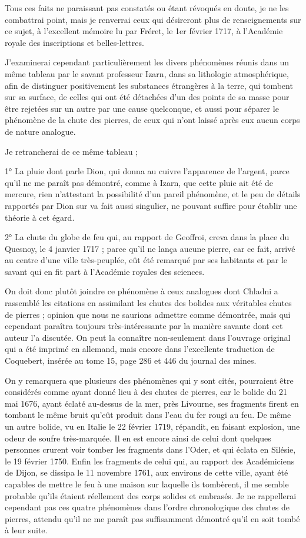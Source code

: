 \documentclass[a4paper, 12pt, oneside, french]{article}
\begin{document}
Tous ces faits ne paraissant pas constatés ou étant révoqués en doute, je ne les combattrai point, mais je renverrai ceux qui désireront plus de renseignements sur ce sujet, à l'excellent mémoire lu par Fréret, le 1er février 1717, à l'Académie royale des inscriptions et belles-lettres.

J'examinerai cependant particulièrement les divers phénomènes réunis dans un même tableau par le savant professeur Izarn, dans sa lithologie atmosphérique, afin de distinguer positivement les substances étrangères à la terre, qui tombent sur sa surface, de celles qui ont été détachées d'un des points de sa masse pour être rejetées sur un autre par une cause quelconque, et aussi pour séparer le phénomène de la chute des pierres, de ceux qui n'ont laissé après eux aucun corps de nature analogue.

Je retrancherai de ce même tableau ;

1° La pluie dont parle Dion, qui donna au cuivre l'apparence de l'argent, parce qu'il ne me paraît pas démontré, comme à Izarn, que cette pluie ait été de mercure, rien n'attestant la possibilité d'un pareil phénomène, et le peu de détails rapportés par Dion sur va fait aussi singulier, ne pouvant suffire pour établir une théorie à cet égard.

2° La chute du globe de feu qui, au rapport de Geoffroi, creva dans la place du Quesnoy, le 4 janvier 1717 ; parce qu'il ne lança aucune pierre, car ce fait, arrivé au centre d'une ville très-peuplée, eût été remarqué par ses habitants et par le savant qui en fit part à l'Académie royales des sciences.

On doit donc plutôt joindre ce phénomène à ceux analogues dont Chladni a rassemblé les citations en assimilant les chutes des bolides aux véritables chutes de pierres ; opinion que nous ne saurions admettre comme démontrée, mais qui cependant paraîtra toujours très-intéressante par la manière savante dont cet auteur l'a discutée. On peut la connaître non-seulement dans l'ouvrage original qui a été imprimé en allemand, mais encore dans l'excellente traduction de Coquebert, insérée au tome 15, page 286 et 446 du journal des mines.

On y remarquera que plusieurs des phénomènes qui y sont cités, pourraient être considérés comme ayant donné lieu à des chutes de pierres, car le bolide du 21 mai 1676, ayant éclaté au-dessus de la mer, près Livourne, ses fragments firent en tombant le même bruit qu'eût produit dans l'eau du fer rougi au feu. De même un autre bolide, vu en Italie le 22 février 1719, répandit, en faisant explosion, une odeur de soufre très-marquée. Il en est encore ainsi de celui dont quelques personnes crurent voir tomber les fragments dans l'Oder, et qui éclata en Silésie, le 19 février 1750. Enfin les fragments de celui qui, au rapport des Académiciens de Dijon, se dissipa le 11 novembre 1761, aux environs de cette ville, ayant été capables de mettre le feu à une maison sur laquelle ils tombèrent, il me semble probable qu'ils étaient réellement des corps solides et embrasés. Je ne rappellerai cependant pas ces quatre phénomènes dans l'ordre chronologique des chutes de pierres, attendu qu'il ne me paraît pas suffisamment démontré qu'il en soit tombé à leur suite.
\end{document}
